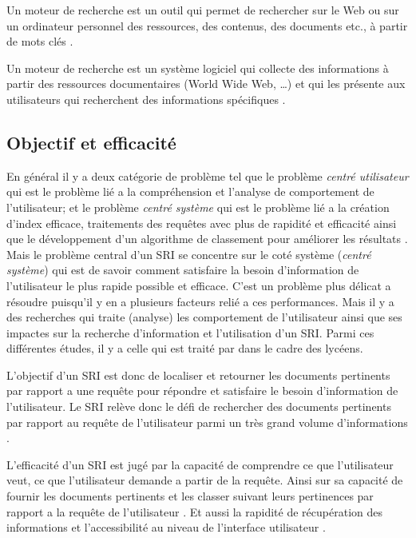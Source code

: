 \begin{definition}
	Un moteur de recherche est un outil qui permet de rechercher sur le Web ou sur un ordinateur personnel des ressources, des contenus, des documents etc., à partir de mots clés \citep{jdn-moteur-de-recherche}.
\end{definition}

\begin{definition}
	Un moteur de recherche est un système logiciel qui collecte des informations à partir des ressources documentaires (World Wide Web, \dots) et qui les présente aux utilisateurs qui recherchent des informations spécifiques \citep{mdn-search-engine}.
\end{definition}

\subsection{Objectif et efficacité}
En général il y a deux catégorie de problème tel que le problème \textit{centré utilisateur} qui est le problème lié a la compréhension et l'analyse de comportement de l'utilisateur; et le problème \textit{centré système} qui est le problème lié a la création d'index efficace, traitements des requêtes avec plus de rapidité et efficacité ainsi que le développement d'un algorithme de classement pour améliorer les résultats \citep{modern-ir}. Mais le problème central d'un SRI se concentre sur le coté système (\textit{centré système}) qui est de savoir comment satisfaire la besoin d'information de l'utilisateur le plus rapide possible et efficace. C'est un problème plus délicat a résoudre puisqu'il y en a plusieurs facteurs relié a ces performances. Mais il y a des recherches qui traite (analyse) les comportement de l'utilisateur ainsi que ses impactes sur la recherche d’information et l'utilisation d'un SRI. Parmi ces différentes études, il y a celle qui est traité par \citeauthor{ri-sur-le-web} \citep{ri-sur-le-web} dans le cadre des lycéens.

L'objectif d'un SRI est donc de localiser et retourner les documents pertinents par rapport a une requête pour répondre et satisfaire le besoin d'information de l'utilisateur. Le SRI relève donc le défi de rechercher des documents pertinents par rapport au requête de l'utilisateur parmi un très grand volume d'informations \citep{amelioration-ri-approche-semantique}.

L'efficacité d'un SRI est jugé par la capacité de comprendre ce que l'utilisateur veut, ce que l'utilisateur demande a partir de la requête. Ainsi sur sa capacité de fournir les documents pertinents et les classer suivant leurs pertinences par rapport a la requête de l'utilisateur \citep{vsm}. Et aussi la rapidité de récupération des informations et l'accessibilité au niveau de l'interface utilisateur \citep{ir-on-web}.

